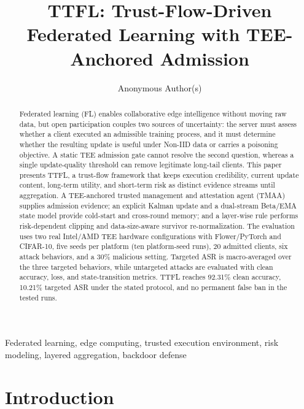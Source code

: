 \documentclass[conference,compsoc]{IEEEtran}
\begin{document}
\title{TTFL: Trust-Flow-Driven Federated Learning with TEE-Anchored Admission}


\author{Anonymous Author(s)}



\maketitle

\begin{abstract}
    Federated learning (FL) enables collaborative edge intelligence without moving raw data, but open participation couples two sources of uncertainty: the server must assess whether a client executed an admissible training process, and it must determine whether the resulting update is useful under Non-IID data or carries a poisoning objective. A static TEE admission gate cannot resolve the second question, whereas a single update-quality threshold can remove legitimate long-tail clients. This paper presents TTFL, a trust-flow framework that keeps execution credibility, current update content, long-term utility, and short-term risk as distinct evidence streams until aggregation. A TEE-anchored trusted management and attestation agent (TMAA) supplies admission evidence; an explicit Kalman update and a dual-stream Beta/EMA state model provide cold-start and cross-round memory; and a layer-wise rule performs risk-dependent clipping and data-size-aware survivor re-normalization. The evaluation uses two real Intel/AMD TEE hardware configurations with Flower/PyTorch and CIFAR-10, five seeds per platform (ten platform-seed runs), 20 admitted clients, six attack behaviors, and a 30\% malicious setting. Targeted ASR is macro-averaged over the three targeted behaviors, while untargeted attacks are evaluated with clean accuracy, loss, and state-transition metrics. TTFL reaches 92.31\% clean accuracy, 10.21\% targeted ASR under the stated protocol, and no permanent false ban in the tested runs.
\end{abstract}

\begin{IEEEkeywords}
    Federated learning, edge computing, trusted execution environment, risk modeling, layered aggregation, backdoor defense
\end{IEEEkeywords}

\section{Introduction}
\end{document}
